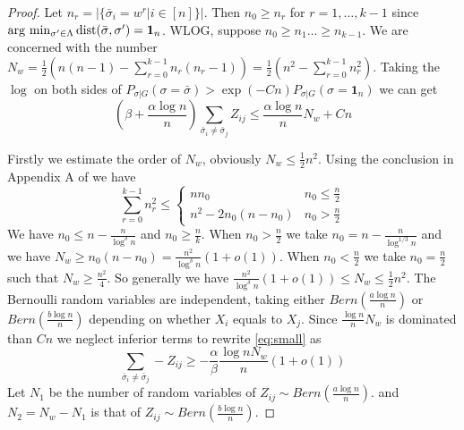 \documentclass{article}
\begin{document}
\begin{proof}
	Let $n_r = |\{\bar{\sigma}_i = w^r | i\in [n] \}|$. Then $n_0 \geq n_r$ for $r=1, \dots, k-1$ since  $\arg\,\min_{\sigma'\in \Lambda} \operatorname{dist}(\bar{\sigma}, \sigma') = \mathbf{1}_n$.
	WLOG, suppose $n_0 \geq n_1 \dots \geq n_{k-1}$.
	We are concerned with the number $N_w = \frac{1}{2}(n(n-1) - \sum_{r=0}^{k-1} n_r(n_r-1))
	=\frac{1}{2}(n^2 - \sum_{r=0}^{k-1} n_r^2)$.
	Taking the $\log$ on both sides of $P_{\sigma | G}(\sigma = \bar{\sigma} ) > \exp(-Cn) P_{\sigma | G}(\sigma = \mathbf{1}_n)$ we can get
	\begin{equation}\label{eq:small}
	(\beta + \frac{\alpha \log n}{n}) \sum_{\bar{\sigma}_i  \neq \bar{\sigma}_j} Z_{ij} \leq \frac{\alpha \log n}{n} N_w + C n
	\end{equation}
	
	Firstly we estimate the order of $N_w$, obviously $N_w \leq \frac{1}{2} n^2$.
	Using the conclusion in Appendix A of \cite{chen2016information} we have
	\begin{equation}
	\sum_{r=0}^{k-1} n_r^2 \leq
	\begin{cases}
	n n_0 & n_0 \leq \frac{n}{2} \\
	n^2 - 2n_0(n-n_0) & n_0 > \frac{n}{2}
	\end{cases}
	\end{equation}
	We have $n_0 \leq n - \frac{n}{\log^{\delta} n}$ and $n_0 \geq \frac{n}{k}$. When $n_0 > \frac{n}{2}$ we take $n_0 = n - \frac{n}{\log^{1/3} n}$
	and we have $N_w \geq n_0 (n - n_0) = \frac{n^2}{\log^{\delta} n}(1+o(1))$. When $n_0 < \frac{n}{2}$ we take $n_0 = \frac{n}{2}$ such that
	$N_w \geq \frac{n^2}{4}$. So generally we have $\frac{n^2}{\log^{\delta} n}(1+o(1)) \leq N_w \leq \frac{1}{2}n^2$.
	The Bernoulli random variables are independent, taking either $Bern(\frac{a\log n}{n})$ or $Bern(\frac{b \log n}{n})$ depending on whether
	$X_i$ equals to $X_j$.
	Since $\frac{\log n}{n} N_w$ is dominated than $Cn$ we neglect inferior terms to rewrite \eqref{eq:small} as
	\begin{equation}
	\sum_{ \bar{\sigma}_i  \neq \bar{\sigma}_j } -Z_{ij} \geq -\frac{\alpha}{\beta}\frac{\log n N_w}{n}(1+o(1))
	\end{equation}
	Let $N_1$ be the number of random variables of $Z_{ij} \sim Bern(\frac{a\log n}{n})$.
	and $N_2 = N_w - N_1$ is that of $Z_{ij} \sim Bern(\frac{b\log n}{n})$.
	

\end{proof}
\end{document}
